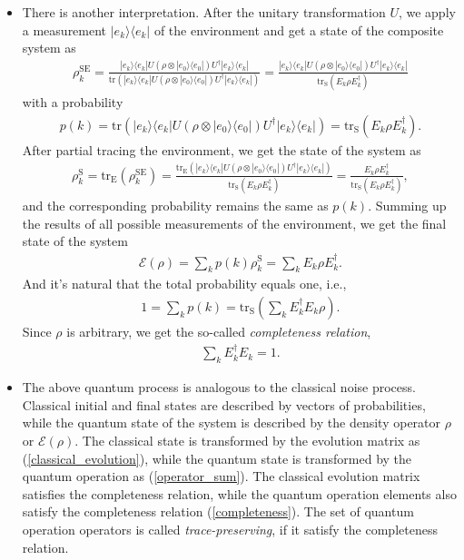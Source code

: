 \documentclass{article}
\newcommand{\ket}[1]{| #1 \rangle}  %
\newcommand{\bra}[1]{\langle #1|} %
\begin{document}
\begin{itemize}
	\item There is another interpretation. After the unitary transformation $U$, we apply a measurement $\ket{e_k}\bra{e_k}$ of the environment and get a state of the composite system as
	\begin{align}
		\rho_k^{\text{SE}}=\frac{ \ket{e_k}\bra{e_k}U(\rho\otimes \ket{e_0}\bra{e_0})U^{\dagger} \ket{e_k}\bra{e_k}} {\text{tr}(\ket{e_k}\bra{e_k}U(\rho\otimes \ket{e_0}\bra{e_0})U^{\dagger} \ket{e_k}\bra{e_k})}
		= \frac{ \ket{e_k}\bra{e_k}U(\rho\otimes \ket{e_0}\bra{e_0})U^{\dagger} \ket{e_k}\bra{e_k}} {\text{tr}_{\text{S}}(E_k\rho E_k^{\dagger})}
	\end{align}
    with a probability 
    \begin{align}
    	p(k)= \text{tr}(\ket{e_k}\bra{e_k}U(\rho\otimes \ket{e_0}\bra{e_0})U^{\dagger} \ket{e_k}\bra{e_k})
    	= \text{tr}_{\text{S}}(E_k\rho E_k^{\dagger}).
    \end{align}
    After partial tracing the environment, we get the state of the system as
    \begin{align}
    	\rho_k^{\text{S}}=\text{tr}_{\text{E}}(\rho_k^{\text{SE}})
    	=\frac{ \text{tr}_{\text{E}}(\ket{e_k}\bra{e_k}U(\rho\otimes \ket{e_0}\bra{e_0})U^{\dagger} \ket{e_k}\bra{e_k})}{\text{tr}_{\text{S}}(E_k\rho E_k^{\dagger})}
    	=\frac{ E_k \rho E_k^{\dagger}}{\text{tr}_{\text{S}}(E_k\rho E_k^{\dagger})},
    \end{align}
    and the corresponding probability remains the same as $p(k)$. Summing up the results of all possible measurements of the environment, we get the final state of the system
    \begin{align}
    	\mathcal{E}(\rho)=\sum_k p(k) \rho_k^{\text{S}} = \sum_k E_k \rho E_k^{\dagger}.
    \end{align}
    And it's natural that the total probability equals one, i.e., 
    \begin{align}
    	1=\sum_k p(k)=\text{tr}_{\text{S}}( \sum_k E_k^{\dagger} E_k\rho ).
    \end{align}
    Since $\rho$ is arbitrary, we get the so-called \textit{completeness relation},
    \begin{align}
    	\sum_k E_k^{\dagger}E_k=1. \label{completeness}
    \end{align}


    \item The above quantum process is analogous to the classical noise process. Classical initial and final states are described by vectors of probabilities, while the quantum state of the system is described by the density operator $\rho$ or $\mathcal{E}(\rho)$. The classical state is transformed by the evolution matrix as (\ref{classical_evolution}), while the quantum state is transformed by the quantum operation as (\ref{operator_sum}).
    The classical evolution matrix satisfies the completeness relation, while the quantum operation elements also satisfy the completeness relation (\ref{completeness}). The set of quantum operation operators is called \textit{trace-preserving}, if it satisfy the completeness relation.
\end{itemize}
\end{document}
